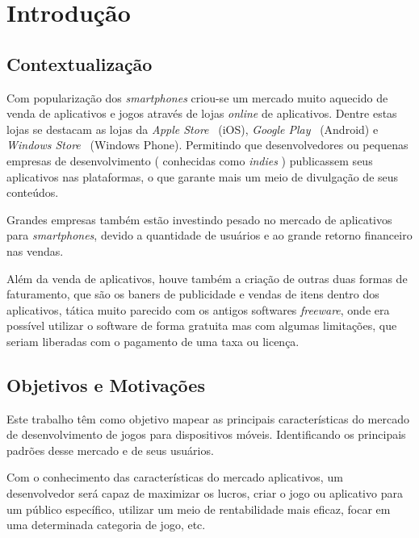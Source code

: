 
\chapter{Introdução}
\label{cap:introducao}


\section{Contextualização}

Com popularização dos \emph{smartphones} criou-se um mercado muito aquecido de venda de aplicativos e jogos através de lojas \emph{online} de aplicativos. Dentre estas lojas se destacam as lojas da \emph{Apple Store}~\cite{appstore} (iOS), \emph{Google Play}~\cite{googleplay} (Android) e \emph{Windows Store}~\cite{windowsphone} (Windows Phone). Permitindo que desenvolvedores ou pequenas empresas de desenvolvimento ( conhecidas como \emph{indies} ) publicassem seus aplicativos nas plataformas, o que garante mais um meio de divulgação de seus conteúdos.


Grandes empresas também estão investindo pesado no mercado de aplicativos para \emph{smartphones}, devido a quantidade de usuários e ao grande retorno financeiro nas vendas.



Além da venda de aplicativos, houve também a criação de outras duas formas de faturamento, que são os baners de publicidade e vendas de itens dentro dos aplicativos, tática muito parecido com os antigos softwares \emph{freeware}, onde era possível utilizar o software de forma gratuita mas com algumas limitações, que seriam liberadas com o pagamento de uma taxa ou licença.







\section{Objetivos e Motivações}

Este trabalho têm como objetivo mapear as principais características do mercado de desenvolvimento de jogos para dispositivos móveis. Identificando os principais padrões desse mercado e de seus usuários.

Com o conhecimento das características do mercado aplicativos, um desenvolvedor será capaz de maximizar os lucros, criar o jogo ou aplicativo para um público específico, utilizar um meio de rentabilidade mais eficaz, focar em uma determinada categoria de jogo, etc.
 

